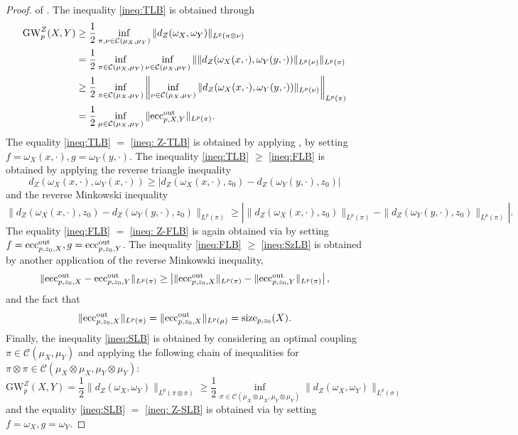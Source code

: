 \documentclass[twoside,11pt]{article}
\theoremstyle{definition}
\newcommand{\dgwz}{\mathrm{GW}_p^Z}
\newcommand{\eccout}{\textnormal{ecc}_{p,X,Y}^{\textnormal{out}}}
\newcommand{\eccoutpX}{\textnormal{ecc}_{p,z_0,X}^{\textnormal{out}}}
\newcommand{\eccoutpY}{\textnormal{ecc}_{p,z_0,Y}^{\textnormal{out}}}
\newcommand{\size}{\textnormal{size}_{p,z_0}}
\begin{document}
\begin{proof}of .
    The inequality \eqref{ineq:TLB} is obtained through
    \begin{align}
        \dgwz(X,Y) &\geq \frac{1}{2}\inf_{\pi, \nu\in \mathcal{C}(\mu_X,\mu_Y)}\|d_Z(\omega_X,\omega_Y)\|_{L^p(\pi \otimes \nu)} \\ 
        &= \frac{1}{2}\inf_{\pi\in  \mathcal{C}(\mu_X,\mu_Y)}\inf_{\nu\in  \mathcal{C}(\mu_X,\mu_Y)}\|\|d_Z(\omega_X(x,\cdot),\omega_Y(y,\cdot))\|_{L^p(\nu)}\|_{L^p(\pi)} \\
        &\geq \frac{1}{2}\inf_{\pi\in  \mathcal{C}(\mu_X,\mu_Y)} \left\| \inf_{\nu\in  \mathcal{C}(\mu_X,\mu_Y)}\|d_Z(\omega_X(x,\cdot),\omega_Y(y,\cdot))\|_{L^p(\nu)}\right\|_{L^p(\pi)}\\
        &= \frac{1}{2}\inf_{\mu\in \mathcal{C}(\mu_X,\mu_Y)}\|\eccout\|_{L^p(\pi)}.
    \end{align}
    The equality \eqref{ineq:TLB} $=$ \eqref{ineq: Z-TLB} is obtained by applying , by setting $f = \omega_X(x,\cdot), g = \omega_Y(y,\cdot)$. The inequality \eqref{ineq:TLB} $\geq$ \eqref{ineq:FLB} is obtained by applying the reverse triangle inequality 
    \[
    d_Z(\omega_X(x,\cdot), \omega_Y(x,\cdot)) \geq |d_Z(\omega_X(x,\cdot),z_0) - d_Z(\omega_Y(y,\cdot),z_0)|
    \]
    and the reverse Minkowski inequality 
    \[
    \|d_Z(\omega_X(x,\cdot),z_0) - d_Z(\omega_Y(y,\cdot),z_0)\|_{L^p(\pi)} \geq \left| \|d_Z(\omega_X(x,\cdot),z_0)\|_{L^p(\pi)}-\|d_Z(\omega_Y(y,\cdot),z_0)\|_{L^p(\pi)}\right|.
    \]
    The equality \eqref{ineq:FLB} $=$ \eqref{ineq: Z-FLB} is again obtained via  by setting $f = \eccoutpX, g=\eccoutpY$. The inequality \eqref{ineq:FLB} $\geq$ \eqref{ineq:SzLB} is obtained by another application of the reverse Minkowski inequality, 
    \[
    \|\eccoutpX-\eccoutpY\|_{L^p(\pi)} \geq \left|\|\eccoutpX\|_{L^p(\pi)}-\|\eccoutpY\|_{L^p(\pi)}\right|,
    \]
    and the fact that 
    \[
    \|\eccoutpX\|_{L^p(\pi)}=\|\eccoutpX\|_{L^p(\mu)}=\size(X).
    \]
    Finally, the inequality \eqref{ineq:SLB} is obtained by considering an optimal coupling $\pi \in \mathcal{C}(\mu_X,\mu_Y)$ and applying the following chain of inequalities for $\pi\otimes \pi\in \mathcal{C}(\mu_X\otimes \mu_X, \mu_Y\otimes \mu_Y)$:
    \begin{equation}
        \dgwz(X,Y) = \frac{1}{2}\|d_Z(\omega_X,\omega_Y)\|_{L^p(\pi\otimes\pi)} \geq \frac{1}{2}\inf_{\sigma \in \mathcal{C}(\mu_X\otimes \mu_X, \mu_Y\otimes \mu_Y)}\|d_Z(\omega_X,\omega_Y)\|_{L^p(\sigma)}
    \end{equation}
    and the equality \eqref{ineq:SLB} $=$ \eqref{ineq: Z-SLB} is obtained via  by setting $f = \omega_X, g = \omega_Y$.
\end{proof}
\end{document}
